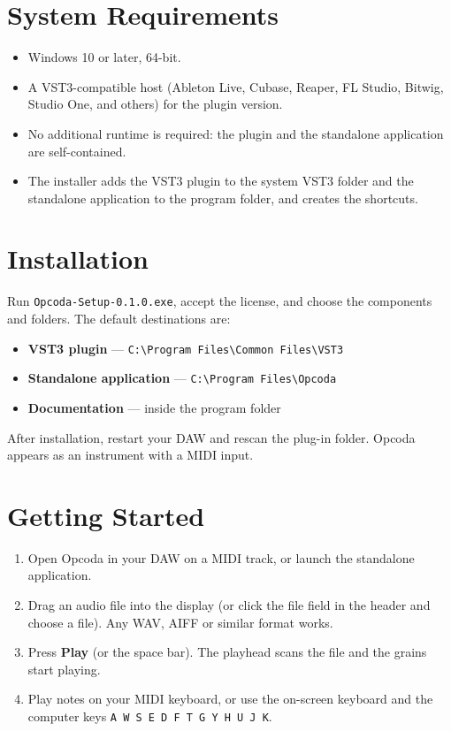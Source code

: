 \documentclass[11pt,a4paper]{article}
\begin{document}
\section{System Requirements}
\begin{itemize}
  \item Windows 10 or later, 64-bit.
  \item A VST3-compatible host (Ableton Live, Cubase, Reaper, FL Studio,
  Bitwig, Studio One, and others) for the plugin version.
  \item No additional runtime is required: the plugin and the standalone
  application are self-contained.
  \item The installer adds the VST3 plugin to the system VST3 folder and the
  standalone application to the program folder, and creates the shortcuts.
\end{itemize}

\section{Installation}
Run \texttt{Opcoda-Setup-0.1.0.exe}, accept the license, and choose the
components and folders. The default destinations are:

\begin{itemize}
  \item \textbf{VST3 plugin} --- \texttt{C:\textbackslash Program Files\textbackslash Common Files\textbackslash VST3}
  \item \textbf{Standalone application} --- \texttt{C:\textbackslash Program Files\textbackslash Opcoda}
  \item \textbf{Documentation} --- inside the program folder
\end{itemize}

After installation, restart your DAW and rescan the plug-in folder. Opcoda
appears as an instrument with a MIDI input.

\section{Getting Started}
\begin{enumerate}
  \item Open Opcoda in your DAW on a MIDI track, or launch the standalone
  application.
  \item Drag an audio file into the display (or click the file field in the
  header and choose a file). Any WAV, AIFF or similar format works.
  \item Press \textbf{Play} (or the space bar). The playhead scans the file and
  the grains start playing.
  \item Play notes on your MIDI keyboard, or use the on-screen keyboard and
  the computer keys \texttt{A W S E D F T G Y H U J K}.
\end{enumerate}
\end{document}
